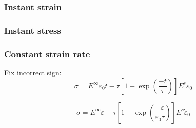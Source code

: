 \documentclass[12pt]{article}
\begin{document}
\subsubsection*{Instant strain}
\subsubsection*{Instant stress}
\subsubsection*{Constant strain rate}

Fix incorrect sign:
\begin{equation}
	\sigma = E^{\infty}\dot{\varepsilon}_{0}t - \tau \left[1-\exp\left(\dfrac{-t}{\tau}\right)\right]E^{s}\dot{\varepsilon}_{0} 
\end{equation}


\begin{equation}
	\sigma = E^{\infty}\varepsilon- \tau \left[1-\exp\left(\dfrac{-\varepsilon}{\dot{\varepsilon}_{0} \tau}\right)\right]E^{s}\dot{\varepsilon}_{0} 
\end{equation}
\end{document}
